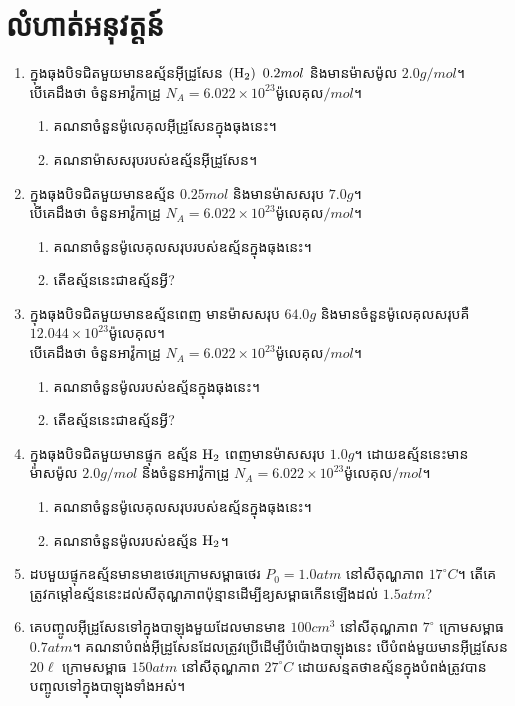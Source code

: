 \section{លំហាត់អនុវត្តន៍}
\begin{enumerate}
	\item ក្នុងធុងបិទជិតមួយមានឧស្ម័នអុីដ្រូសែន $\left(\ce{H2}\right)~0.2mol$ និងមានម៉ាសម៉ូល $2.0g/mol$។\\
	បើគេដឹងថា ចំនួនអាវ៉ូកាដ្រូ $N_{A}=6.022\times10^{23}$ម៉ូលេគុល$/mol$។
	\begin{enumerate}[k]
		\item គណនាចំនួនម៉ូលេគុលអុីដ្រូសែនក្នុងធុងនេះ។
		\item គណនាម៉ាសសរុបរបស់ឧស្ម័នអុីដ្រូសែន។
	\end{enumerate}
	\item ក្នុងធុងបិទជិតមួយមានឧស្ម័ន $0.25mol$ និងមានម៉ាសសរុប $7.0g$។\\
	បើគេដឹងថា ចំនួនអាវ៉ូកាដ្រូ $N_{A}=6.022\times10^{23}$ម៉ូលេគុល$/mol$។
	\begin{enumerate}[k]
		\item គណនាចំនួនម៉ូលេគុលសរុបរបស់ឧស្ម័នក្នុងធុងនេះ។
		\item តើឧស្ម័ននេះជាឧស្ម័នអ្វី?
	\end{enumerate}
	\item ក្នុងធុងបិទជិតមួយមានឧស្ម័នពេញ មានម៉ាសសរុប $64.0g$ និងមានចំនួនម៉ូលេគុលសរុបគឺ $12.044\times10^{23}$ម៉ូលេគុល។\\
	បើគេដឹងថា ចំនួនអាវ៉ូកាដ្រូ $N_{A}=6.022\times10^{23}$ម៉ូលេគុល$/mol$។
	\begin{enumerate}[k]
		\item គណនាចំនួនម៉ូលរបស់ឧស្ម័នក្នុងធុងនេះ។
		\item តើឧស្ម័ននេះជាឧស្ម័នអ្វី?
	\end{enumerate}
	\item ក្នុងធុងបិទជិតមួយមានផ្ទុក ឧស្ម័ន $\ce{H2}$ ពេញមានម៉ាសសរុប $1.0g$។ ដោយឧស្ម័ននេះមានម៉ាសម៉ូល $2.0g/mol$ និងចំនួនអាវ៉ូកាដ្រូ $N_{A}=6.022\times10^{23}$ម៉ូលេគុល$/mol$។
	\begin{enumerate}[k]
		\item គណនាចំនួនម៉ូលេគុលសរុបរបស់ឧស្ម័នក្នុងធុងនេះ។
		\item គណនាចំនួនម៉ូលរបស់ឧស្ម័ន $\ce{H2}$។
	\end{enumerate}
	\item ដបមួយផ្ទុកឧស្ម័នមានមាឌថេរក្រោមសម្ពាធថេរ $P_{0}=1.0atm$ នៅសីតុណ្ហភាព $17^\circ C$។ តើគេត្រូវកម្តៅឧស្ម័ននេះដល់សីតុណ្ហភាពប៉ុន្មានដើម្បីឧ្យសម្ពាធកើនឡើងដល់ $1.5atm$?
	\item គេបញ្ចូលអ៊ីដ្រូសែនទៅក្នុងបាឡុងមួយដែលមានមាឌ $100cm^{3}$ នៅសីតុណ្ហភាព $7^\circ$ ក្រោមសម្ពាធ $0.7atm$។ គណនាបំពង់អ៊ីដ្រូសែនដែលត្រូវប្រើដើម្បីបំប៉ោងបាឡុងនេះ បើបំពង់មួយមានអ៊ីដ្រូសែន $20\ell$ ក្រោមសម្ពាធ $150atm$ នៅសីតុណ្ហភាព $27^\circ C$ ដោយសន្មតថាឧស្ម័នក្នុងបំពង់ត្រូវបានបញ្ចូលទៅក្នុងបាឡុងទាំងអស់។

\end{enumerate}
